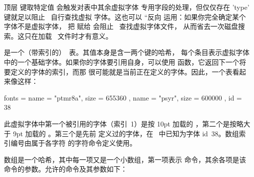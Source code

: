 顶层  键取特定值  会触发对表中其余虚拟字体
专用字段的处理，但仅仅存在 'type' 键就足以阻止 \LUATEX\ 自行查找虚拟
字体。这也可以 ``反向 运用：如果你完全确定某个字体不是虚拟字体，
把  赋给  会阻止 \LUATEX\ 查找虚拟字体文件，
从而省去一次磁盘搜索。这只在加载 \TFM\ 文件时才有意义。

 是一个（带索引的）\LUA\ 表。其值本身是含一两个键的哈希，
每个条目表示虚拟字体中的一个基础字体。如果你的字体要引用自身，可以使用
 函数，它返回下一个将要定义的字体的索引，而那
很可能就是当前正在定义的字体。因此，一个表看起来像这样：

\begin{typing}
fonts = {
  { name = "ptmr8a", size = 655360 },
  { name = "psyr", size = 600000 },
  { id = 38 }
}
\end{typing}

此虚拟字体中第一个被引用的字体（索引~1）是按 10pt 加载的
，第二个是按略大于 9pt 加载的 。第三个是先前
定义过的字体，在 \LUATEX\ 中已知为字体 id~38。数组索引编号由属于各字符
的字符命令定义使用。

 数组是一个哈希，其中每一项又是一个小数组，第一项表示
命令，其余各项是该命令的参数。允许的命令及其参数如下：

